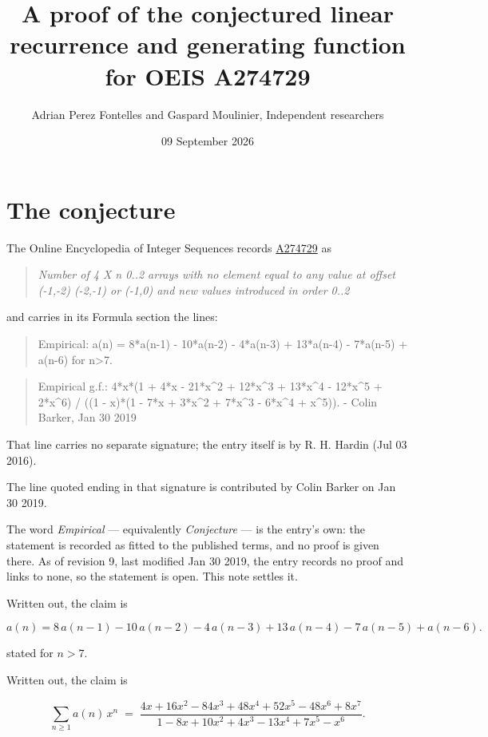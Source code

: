 \documentclass[11pt]{article}
\title{A proof of the conjectured linear recurrence and generating function for OEIS A274729}
\author{Adrian Perez Fontelles and Gaspard Moulinier, Independent researchers}
\date{09 September 2026}
\theoremstyle{definition}
\begin{document}
\maketitle
\section{The conjecture}

The Online Encyclopedia of Integer Sequences records \href{https://oeis.org/A274729}{A274729} as

\begin{quote}\itshape Number of 4 X n 0..2 arrays with no element equal to any value at offset (-1,-2) (-2,-1) or (-1,0) and new values introduced in order 0..2\end{quote}

and carries in its Formula section the lines:

\begin{quote}\ttfamily Empirical: a(n) = 8*a(n-1) - 10*a(n-2) - 4*a(n-3) + 13*a(n-4) - 7*a(n-5) + a(n-6) for n>7.\end{quote}

\begin{quote}\ttfamily Empirical g.f.: 4*x*(1 + 4*x - 21*x\textasciicircum{}2 + 12*x\textasciicircum{}3 + 13*x\textasciicircum{}4 - 12*x\textasciicircum{}5 + 2*x\textasciicircum{}6) / ((1 - x)*(1 - 7*x + 3*x\textasciicircum{}2 + 7*x\textasciicircum{}3 - 6*x\textasciicircum{}4 + x\textasciicircum{}5)). - Colin Barker, Jan 30 2019\end{quote}

That line carries no separate signature; the entry itself is by R. H. Hardin (Jul 03 2016).

The line quoted ending in that signature is contributed by Colin Barker on Jan 30 2019.

The word {\itshape Empirical} --- equivalently {\itshape Conjecture} --- is the entry's own: the statement is recorded as fitted to the published terms, and no proof is given there. As of revision 9, last modified Jan 30 2019, the entry records no proof and links to none, so the statement is open. This note settles it.

Written out, the claim is

\[a(n) = 8\,a(n-1) - 10\,a(n-2) - 4\,a(n-3) + 13\,a(n-4) - 7\,a(n-5) + a(n-6).\]

stated for $n > 7$.

Written out, the claim is

\[\sum_{n \ge 1} a(n)\,x^n \;=\; \frac{4x + 16x^{2} - 84x^{3} + 48x^{4} + 52x^{5} - 48x^{6} + 8x^{7}}{1 - 8x + 10x^{2} + 4x^{3} - 13x^{4} + 7x^{5} - x^{6}}.\]
\end{document}
